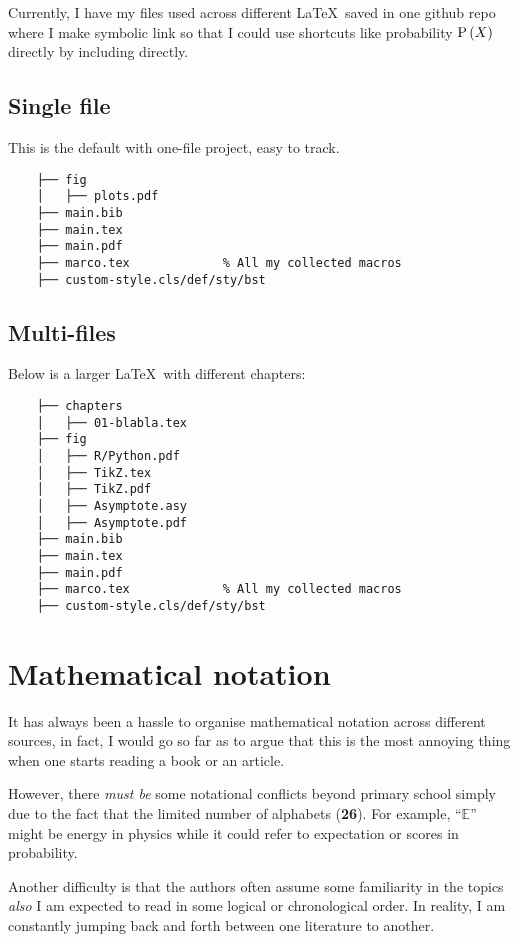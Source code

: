 \documentclass[aos,preprint]{imsart}
\begin{document}
Currently, I have my files used across different \LaTeX\ saved in one
github repo where I make symbolic link so that I could use shortcuts like probability
$\operatorname{\mathrm{P}} \left( {X} \right)$ directly by including directly.

\subsection{Single file}

This is the default with one-file project, easy to track.

\begin{Verbatim}
	├── fig
	│   ├── plots.pdf
	├── main.bib
	├── main.tex
	├── main.pdf
	├── marco.tex             % All my collected macros
	├── custom-style.cls/def/sty/bst
\end{Verbatim}

\subsection{Multi-files}

Below is a larger \LaTeX\ with different chapters:

\begin{Verbatim}
	├── chapters
	│   ├── 01-blabla.tex
	├── fig
	│   ├── R/Python.pdf
	│   ├── TikZ.tex
	│   ├── TikZ.pdf
	│   ├── Asymptote.asy
	│   ├── Asymptote.pdf
	├── main.bib
	├── main.tex
	├── main.pdf
	├── marco.tex             % All my collected macros
	├── custom-style.cls/def/sty/bst
\end{Verbatim}


\section{Mathematical notation}

It has always been a hassle to organise mathematical notation across different sources,
in fact, I would go so far as to argue that this is the most annoying thing
when one starts reading a book or an article.

However, there \textit{must be} some notational conflicts beyond primary school
simply due to the fact that the limited number of alphabets (\textbf{26}).
For example, ``$\mathbb{E}$'' might be energy in physics
while it could refer to expectation or scores in probability.

Another difficulty is that the authors often assume some familiarity in the
topics
\emph{also} I am expected to read in some logical or chronological order.
In reality, I am constantly jumping back and forth between one literature to
another.
\end{document}
